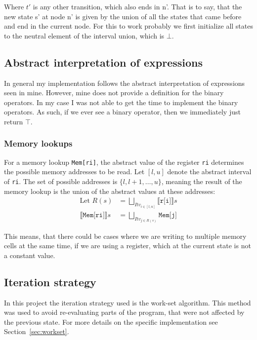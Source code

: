 Where $t'$ is any other transition, which also ends in n'. That is to say, that
the new state s' at node n' is given by the union of all the states that came
before and end in the current node. For this to work probably we first
initialize all states to the neutral element of the interval union, which is
$\bot$.


\subsection{Abstract interpretation of expressions}
In general my implementation follows the abstract interpretation of expressions
seen in mine\cite{mine}. However, mine does not provide a definition for the
binary operators. In my case I was not able to get the time to implement the
binary operators. As such, if we ever see a binary operator, then we
immediately just return $\top$.

\subsubsection{Memory lookups}\label{sec:introductionMem}
For a memory lookup \texttt{Mem[ri]}, the abstract value of the register
\texttt{ri} determines the possible memory addresses to be read. Let $[l, u]$
denote the abstract interval of \texttt{ri}. The set of possible addresses is
$\{l, l+1, \dots, u\}$, meaning the result of the memory lookup is the union of
the abstract values at these addresses:
\begin{align}
  \text{Let } R(s)&= \bigsqcup_{Itv_{i \in [l, u]}} \llbracket \texttt{r[i]} \rrbracket s \\
  \llbracket \texttt{Mem[ri]} \rrbracket s &= \bigsqcup_{Itv_{j \in R(s)}} \texttt{Mem[j]}
\end{align}

This means, that there could be cases where we are writing to multiple memory
cells at the same time, if we are using a register, which at the current state
is not a constant value.


\subsection{Iteration strategy}
In this project the iteration strategy used is the work-set algorithm. This
method was used to avoid re-evaluating parts of the program, that were not
affected by the previous state. For more details on the specific implementation
see Section~\ref{sec:workset}.

